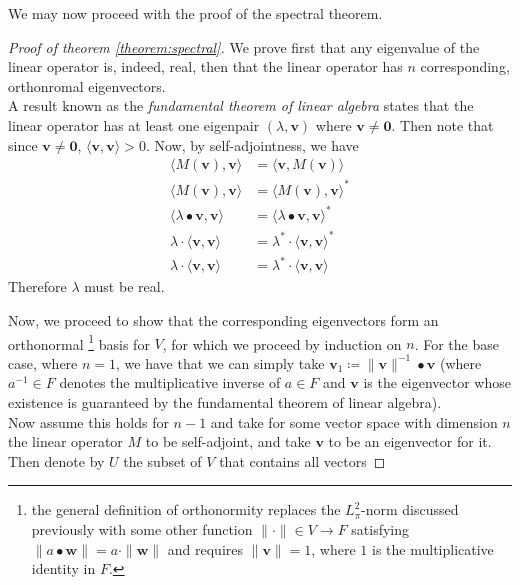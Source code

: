 	We may now proceed with the proof of the spectral theorem.
	\begin{proof}[Proof of theorem \ref{theorem:spectral}]
		We prove first that any eigenvalue of the linear operator is, indeed, real, then
		that the linear operator has $n$ corresponding, orthonromal eigenvectors.\\
		A result known as the \emph{fundamental theorem of linear algebra} states that 
		the linear operator has at least one eigenpair $(\lambda, \mathbf{v})$ where 
		$\mathbf{v} \neq \mathbf{0}$. Then note that since $\mathbf{v} \neq\mathbf{0}$,
		$\langle \mathbf{v},\mathbf{v}\rangle > 0$. Now, by self-adjointness, we have
		\begin{align*}
			\langle M(\mathbf{v}),\mathbf{v}\rangle &= 
			\langle \mathbf{v},M(\mathbf{v})\rangle \\
			\langle M(\mathbf{v}),\mathbf{v}\rangle &= 
			\langle M(\mathbf{v}),\mathbf{v}\rangle^* \\
			\langle \lambda \bullet \mathbf{v},\mathbf{v}\rangle &= 
			\langle \lambda \bullet \mathbf{v},\mathbf{v}\rangle^* \\
			\lambda \cdot \langle\mathbf{v},\mathbf{v}\rangle &=
			\lambda^* \cdot \langle\mathbf{v},\mathbf{v}\rangle^* \\
			\lambda \cdot \langle\mathbf{v},\mathbf{v}\rangle &=
			\lambda^* \cdot \langle\mathbf{v},\mathbf{v}\rangle 
		\end{align*}
		Therefore $\lambda$ must be real.\par
		Now, we proceed to show that the corresponding eigenvectors form an orthonormal%
		\footnote{the general definition of orthonormity replaces the $L^2_\pi$-norm 
		discussed previously with some other function $\|\cdot\|\in V\rightarrow F$ 
		satisfying $\|a\bullet \mathbf{w}\| = a\cdot \|\mathbf{w}\|$
		and requires  $\|\mathbf{v}\|= 1$, where $1$ is the multiplicative identity in $F$.} 
		basis for $V$, for which we proceed by induction on $n$. For the base case, where 
		$n = 1$, we have that we can simply take $\mathbf{v}_1 \coloneqq 
		\|\mathbf{v}\|^{-1}\bullet \mathbf{v}$ (where $a^{-1} \in F$ denotes the 
		multiplicative inverse of $a\in F$ and $\mathbf{v}$ is the eigenvector whose 
		existence is guaranteed by the fundamental theorem of linear algebra). \\
		Now assume this holds for $n-1$ and take for some vector space with dimension $n$ 
		the linear operator $M$ to be self-adjoint, and take $\mathbf{v}$ to be an 
		eigenvector for it. Then denote by $U$ the subset of $V$ that contains all vectors 

\end{proof}
